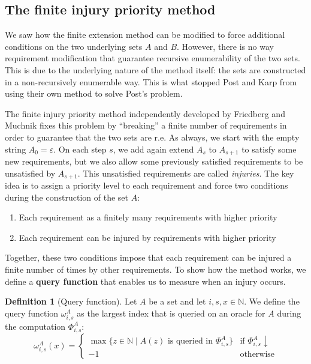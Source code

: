 \documentclass[12pt,a4paper]{article}
\theoremstyle{definition}
\newtheorem{definition}{Definition}
\newcommand{\curlyquotes}[1]{\textquotedblleft #1\textquotedblright}
\newcommand{\N}{\mathbb{N}}                     %
\begin{document}
    \subsection{The finite injury priority method}

    We saw how the finite extension method can be modified to force additional conditions on the two underlying sets $A$ and $B$. However, there is no way requirement modification that guarantee recursive enumerability of the two sets. This is due to the underlying nature of the method itself: the sets are constructed in a non-recursively enumerable way. This is what stopped Post and Karp from using their own method to solve Post's problem.
    
    The finite injury priority method independently developed by Friedberg and Muchnik fixes this problem by \curlyquotes{breaking} a finite number of requirements in order to guarantee that the two sets are r.e. As always, we start with the empty string $A_0 = \varepsilon$. On each step $s$, we add again extend $A_s$ to $A_{s+1}$ to satisfy some new requirements, but we also allow some previously satisfied requirements to be unsatisfied by $A_{s+1}$. This unsatisfied requirements are called \textit{injuries}. The key idea is to assign a priority level to each requirement and force two conditions during the construction of the set $A$:
    \begin{enumerate}
        \item Each requirement as a finitely many requirements with higher priority
        \item Each requirement can be injured by requirements with higher priority 
    \end{enumerate}

    Together, these two conditions impose that each requirement can be injured a finite number of times by other requirements. To show how the method works, we define a \textbf{query function} that enables us to measure when an injury occurs. 

    \begin{definition}[Query function]
        Let $A$ be a set and let $i,s,x \in \N$. We define the query function $\omega_{i,s}^A$ as the largest index that is queried on an oracle for $A$ during the computation $\Phi_{i,s}^A$:
        \[\omega_{i,s}^A(x) = \left \{ \begin{array}{ll}
            \max \{z \in \N \mid A(z) \text{ is queried in } \Phi_{i,s}^A\} & \text{if } \Phi_{i,s}^A \downarrow \\
            -1 & \text{otherwise}
        \end{array}\right .\]
    \end{definition}
\end{document}
